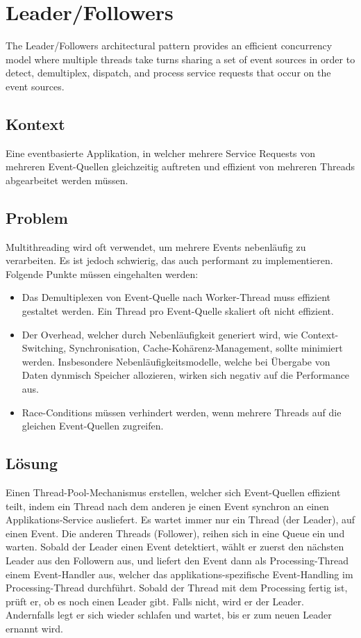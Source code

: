 \section{Leader/Followers}

The Leader/Followers architectural pattern provides an efficient concurrency model where multiple threads take turns sharing a set of event sources in order to detect, demultiplex, dispatch, and process service requests that occur on the event sources.

\subsection{Kontext}

Eine eventbasierte Applikation, in welcher mehrere Service Requests von mehreren Event-Quellen gleichzeitig auftreten und effizient von mehreren Threads abgearbeitet werden müssen.

\subsection{Problem}

Multithreading wird oft verwendet, um mehrere Events nebenläufig zu verarbeiten. Es ist jedoch schwierig, das auch performant zu implementieren.
Folgende Punkte müssen eingehalten werden:
\begin{itemize}
	\item Das Demultiplexen von Event-Quelle nach Worker-Thread muss effizient gestaltet werden. Ein Thread pro Event-Quelle skaliert oft nicht effizient.
	\item Der Overhead, welcher durch Nebenläufigkeit generiert wird, wie Context-Switching, Synchronisation, Cache-Kohärenz-Management, sollte minimiert werden. Insbesondere Nebenläufigkeitsmodelle, welche bei Übergabe von Daten dynmisch Speicher allozieren, wirken sich negativ auf die Performance aus.
	\item Race-Conditions müssen verhindert werden, wenn mehrere Threads auf die gleichen Event-Quellen zugreifen.
\end{itemize}

\subsection{Lösung}

Einen Thread-Pool-Mechanismus erstellen, welcher sich Event-Quellen effizient teilt, indem ein Thread nach dem anderen je einen Event synchron an einen Applikations-Service ausliefert. Es wartet immer nur ein Thread (der Leader), auf einen Event. Die anderen Threads (Follower), reihen sich in eine Queue ein und warten. Sobald der Leader einen Event detektiert, wählt er zuerst den nächsten Leader aus den Followern aus, und liefert den Event dann als Processing-Thread einem Event-Handler aus, welcher das applikations-spezifische Event-Handling im Processing-Thread durchführt. Sobald der Thread mit dem Processing fertig ist, prüft er, ob es noch einen Leader gibt. Falls nicht, wird er der Leader. Andernfalls legt er sich wieder schlafen und wartet, bis er zum neuen Leader ernannt wird.


